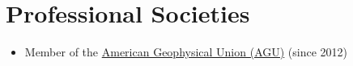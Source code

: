 \section{Professional Societies}

\begin{itemize}
\item Member of the \href{https://sites.agu.org/}{American Geophysical Union (AGU)} (since 2012)
\end{itemize}
